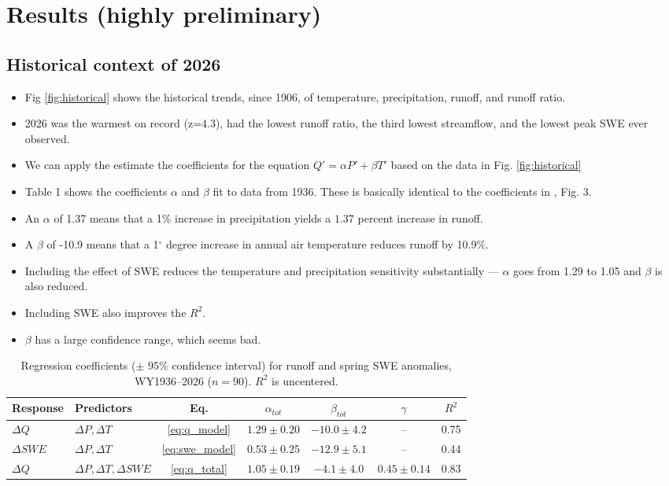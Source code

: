 \documentclass[draft]{agujournal2019}
\begin{document}
\section{Results (highly preliminary)}
\subsection{Historical context of 2026}
\begin{itemize}
    \item Fig \ref{fig:historical} shows the historical trends, since 1906, of temperature, precipitation, runoff, and runoff ratio. 
    \item 2026 was the warmest on record (z=4.3), had the lowest runoff ratio, the third lowest streamflow, and the lowest peak SWE ever observed. 
    \item We can apply the estimate the coefficients for the equation $Q' = \alpha P' + \beta T'$ based on the data in Fig. \ref{fig:historical}
    \item Table 1 shows the coefficients $\alpha$ and $\beta$ fit to data from 1936. These is basically identical to the coefficients in , Fig. 3. 
    \item An $\alpha$ of 1.37 means that a 1$\%$ increase in precipitation yields a $1.37$ percent increase in runoff. 
    \item A $\beta$ of -10.9 means that a 1$^\circ$ degree increase in annual air temperature reduces runoff by 10.9$\%$.
    \item Including the effect of SWE reduces the temperature and precipitation sensitivity substantially — $\alpha$ goes from 1.29 to 1.05 and $\beta$ is also reduced. 
    \item Including SWE also improves the $R^2$.
    \item $\beta$ has a large confidence range, which seems bad. 
\end{itemize}



\begin{table}[h]
\caption{Regression coefficients ($\pm$ 95\% confidence interval) for runoff and spring SWE anomalies, WY1936--2026 ($n= 90$). 
$R^2$ is uncentered.
}
\centering
\begin{tabular}{l l c c c c c}
\hline
Response & Predictors & Eq. & $\alpha_{tot}$ & $\beta_{tot}$  & $\gamma$  & $R^2$ \\
\hline
$\Delta Q$ & $\Delta P, \Delta T$ & \ref{eq:q_model} & $1.29 \pm 0.20$ & $-10.0 \pm 4.2$ & -- & 0.75 \\
$\Delta SWE$ & $\Delta P, \Delta T$ & \ref{eq:swe_model} & $0.53 \pm 0.25$ & $-12.9 \pm 5.1$ & -- & 0.44 \\
$\Delta Q$ & $\Delta P, \Delta T, \Delta SWE$ & \ref{eq:q_total} & $1.05 \pm 0.19$ & $-4.1 \pm 4.0$ & $0.45 \pm 0.14$ & 0.83 \\
\hline
\end{tabular}
\label{tab:coefs}
\end{table}
\end{document}
